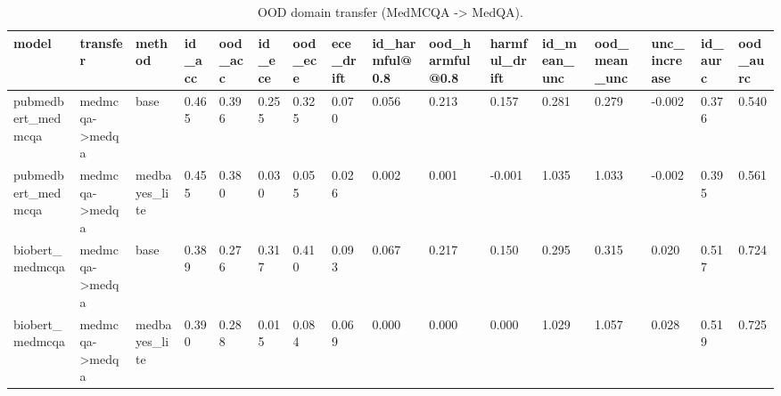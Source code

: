 \begin{table}[htbp]
\centering
\caption{OOD domain transfer (MedMCQA -> MedQA).}
\label{tab:ood}
\begin{tabular}{llllllllllllllll}
\toprule
model & transfer & method & id\_acc & ood\_acc & id\_ece & ood\_ece & ece\_drift & id\_harmful@0.8 & ood\_harmful@0.8 & harmful\_drift & id\_mean\_unc & ood\_mean\_unc & unc\_increase & id\_aurc & ood\_aurc \\
\midrule
pubmedbert\_medmcqa & medmcqa->medqa & base & 0.465 & 0.396 & 0.255 & 0.325 & 0.070 & 0.056 & 0.213 & 0.157 & 0.281 & 0.279 & -0.002 & 0.376 & 0.540 \\
pubmedbert\_medmcqa & medmcqa->medqa & medbayes\_lite & 0.455 & 0.380 & 0.030 & 0.055 & 0.026 & 0.002 & 0.001 & -0.001 & 1.035 & 1.033 & -0.002 & 0.395 & 0.561 \\
biobert\_medmcqa & medmcqa->medqa & base & 0.389 & 0.276 & 0.317 & 0.410 & 0.093 & 0.067 & 0.217 & 0.150 & 0.295 & 0.315 & 0.020 & 0.517 & 0.724 \\
biobert\_medmcqa & medmcqa->medqa & medbayes\_lite & 0.390 & 0.288 & 0.015 & 0.084 & 0.069 & 0.000 & 0.000 & 0.000 & 1.029 & 1.057 & 0.028 & 0.519 & 0.725 \\
\bottomrule
\end{tabular}
\end{table}
